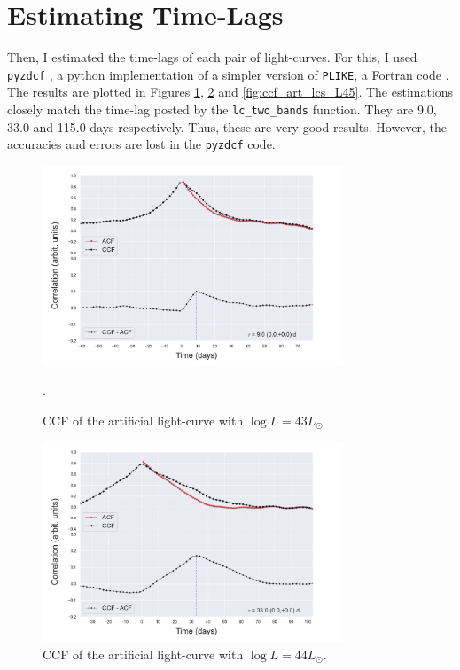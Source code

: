 \documentclass[letterpaper, oneside]{article}
\begin{document}
\section{Estimating Time-Lags}

Then, I estimated the time-lags of each pair of light-curves. For this, I used \texttt{pyzdcf} \cite{pyzdcf_docs}, a python implementation of a simpler version of \texttt{PLIKE}, a Fortran code \cite{Alexander_2013, tal_alexander_software}. The results are plotted in Figures \ref{fig:ccf_art_lcs_L43}, \ref{fig:ccf_art_lcs_L44} and \ref{fig:ccf_art_lcs_L45}. The estimations closely match the time-lag posted by the \texttt{lc\_two\_bands} function. They are 9.0, 33.0 and 115.0 days respectively. Thus, these are very good results. However, the accuracies and errors are lost in the \texttt{pyzdcf} code.

\begin{figure}[h]
	\centering
	\includegraphics[width=0.8\textwidth]{../CCF_plots/x_y_bands_43_final.pdf}
	\caption{CCF of the artificial light-curve with $\log L = 43 L_{\odot}$}.
	\label{fig:ccf_art_lcs_L43}
\end{figure}

\begin{figure}[p]
	\centering
	\includegraphics[width=0.8\textwidth]{../CCF_plots/x_y_bands_44_final.pdf}
	\caption{CCF of the artificial light-curve with $\log L = 44 L_{\odot}$.}
	\label{fig:ccf_art_lcs_L44}
\end{figure}
\end{document}
